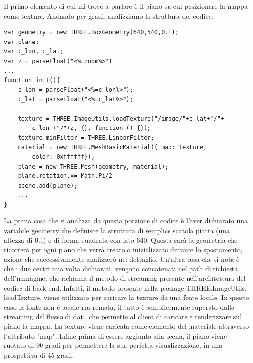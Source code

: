 Il primo elemento di cui mi trovo a parlare è il piano su cui posizionare la mappa come texture. Andando per gradi, analizziamo la struttura del codice:
\begin{verbatim}
var geometry = new THREE.BoxGeometry(640,640,0.1);
var plane;
var c_lon, c_lat;
var z = parseFloat("<%=zoom%>")
...
function init(){
	c_lon = parseFloat("<%=c_lon%>");
    c_lat = parseFloat("<%=c_lat%>");

    texture = THREE.ImageUtils.loadTexture("/image/"+c_lat+"/"+
    	c_lon +"/"+z, {}, function () {});
    texture.minFilter = THREE.LinearFilter;
    material = new THREE.MeshBasicMaterial({ map: texture, 
    	color: 0xffffff});
    plane = new THREE.Mesh(geometry, material);
    plane.rotation.x=-Math.Pi/2
    scene.add(plane);
    ...
}
\end{verbatim}
La prima cosa che si analizza da questa porzione di codice è l'aver dichiarato una variabile geometry che definisce la struttura di semplice scatola piatta (una altezza di 0.1) e di forma quadrata con lato 640. Questa sarà la geometria che ricorrerà per ogni piano che verrà creato o inizializzato durante lo spostamento, azione che successivamente analizzerò nel dettaglio. Un'altra cosa che si nota è che i due centri una volta dichiarati, vengono concatenati nel path di richiesta dell'immagine, che richiama il metodo di streaming presente nell'architettura del codice di back end. Infatti, il metodo presente nella package THREE.ImageUtils, loadTexture, viene utilizzato per caricare la texture da una fonte locale. In questo caso la fonte non è locale ma remota, il tutto è semplicemente superato dallo streaming del flusso di dati, che permette al client di caricare e renderizzare sul piano la mappa. La texture viene caricata come elemento del materiale attraverso l'attributo "map". Infine prima di essere aggiunto alla scena, il piano viene ruotato di 90 gradi per permettere la sua perfetta visualizzazione, in una prospettiva di 45 gradi.


